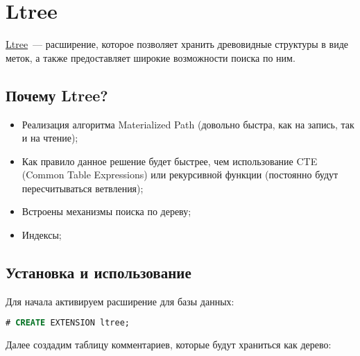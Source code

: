 \section{Ltree}

\href{https://www.postgresql.org/docs/current/static/ltree.html}{Ltree}~--- расширение, которое позволяет хранить древовидные структуры в виде меток, а также предоставляет широкие возможности поиска по ним.

\subsection{Почему Ltree?}

\begin{itemize}
  \item Реализация алгоритма Materialized Path (довольно быстра, как на запись, так и на чтение);
  \item Как правило данное решение будет быстрее, чем использование CTE (Common Table Expressions) или рекурсивной функции (постоянно будут пересчитываться ветвления);
  \item Встроены механизмы поиска по дереву;
  \item Индексы;
\end{itemize}

\subsection{Установка и использование}

Для начала активируем расширение для базы данных:

\begin{lstlisting}[language=SQL,label=lst:pgltree1,caption=Ltree]
# CREATE EXTENSION ltree;
\end{lstlisting}

Далее создадим таблицу комментариев, которые будут храниться как дерево:


